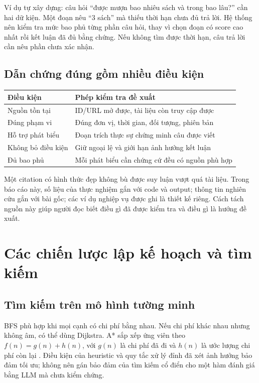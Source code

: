 Ví dụ tự xây dựng: câu hỏi ``được mượn bao nhiêu sách và trong bao lâu?'' cần hai dữ
kiện. Một đoạn nêu ``3 sách'' mà thiếu thời hạn chưa đủ trả lời. Hệ thống nên kiểm tra
mức bao phủ từng phần câu hỏi, thay vì chọn đoạn có score cao nhất rồi kết luận đã
đủ bằng chứng. Nếu không tìm được thời hạn, câu trả lời cần nêu phần chưa xác nhận.

\subsection{Dẫn chứng đúng gồm nhiều điều kiện}
\begin{center}\small
\begin{tabularx}{\linewidth}{@{}p{3.0cm}X@{}}\toprule
\textbf{Điều kiện} & \textbf{Phép kiểm tra đề xuất}\\\midrule
Nguồn tồn tại & ID/URL mở được, tài liệu còn truy cập được\\
Đúng phạm vi & Đúng đơn vị, thời gian, đối tượng, phiên bản\\
Hỗ trợ phát biểu & Đoạn trích thực sự chứng minh câu được viết\\
Không bỏ điều kiện & Giữ ngoại lệ và giới hạn ảnh hưởng kết luận\\
Đủ bao phủ & Mỗi phát biểu cần chứng cứ đều có nguồn phù hợp\\\bottomrule
\end{tabularx}\end{center}
Một citation có hình thức đẹp không bù được suy luận vượt quá tài liệu. Trong báo cáo
này, số liệu của thực nghiệm gắn với code và output; thông tin nghiên cứu gắn với bài
gốc; các ví dụ nghiệp vụ được ghi là thiết kế riêng. Cách tách nguồn này giúp người
đọc biết điều gì đã được kiểm tra và điều gì là hướng đề xuất.

\newpage
\section{Các chiến lược lập kế hoạch và tìm kiếm}
\subsection{Tìm kiếm trên mô hình tường minh}
BFS phù hợp khi mọi cạnh có chi phí bằng nhau. Nếu chi phí khác nhau nhưng không âm,
có thể dùng Dijkstra. A* sắp xếp ứng viên theo $f(n)=g(n)+h(n)$, với $g(n)$ là chi phí
đã đi và $h(n)$ là ước lượng chi phí còn lại \cite{astar}. Điều kiện của heuristic và quy tắc xử lý
đỉnh đã xét ảnh hưởng bảo đảm tối ưu; không nên gán bảo đảm của tìm kiếm cổ điển cho
một hàm đánh giá bằng LLM mà chưa kiểm chứng.

